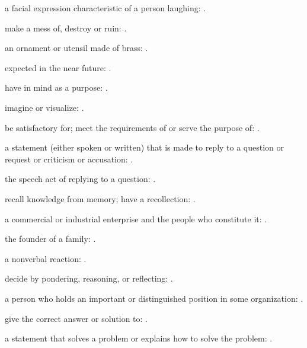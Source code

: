   a facial expression characteristic of a person laughing: .

  make a mess of, destroy or ruin:   .

  an ornament or utensil made of brass: .

  expected in the near future: .

  have in mind as a purpose:   .

  imagine or visualize: .

  be satisfactory for; meet the requirements of or serve the purpose of: .

  a statement (either spoken or written) that is made to reply to a question or request or criticism or accusation:   .

  the speech act of replying to a question: .

  recall knowledge from memory; have a recollection:   .

  a commercial or industrial enterprise and the people who constitute it:   .

  the founder of a family:   .

  a nonverbal reaction: .

  decide by pondering, reasoning, or reflecting: .

  a person who holds an important or distinguished position in some organization: .

  give the correct answer or solution to: .

  a statement that solves a problem or explains how to solve the problem:   .

